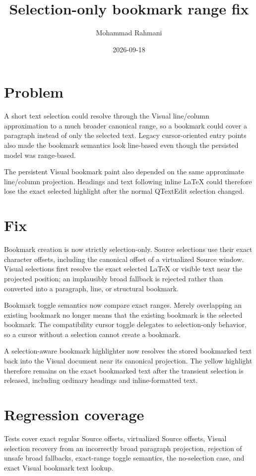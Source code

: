 \documentclass[a4paper]{article}
\title{Selection-only bookmark range fix}
\date{2026-09-18}
\author{Mohammad Rahmani}
\begin{document}
\maketitle

\section{Problem}
A short text selection could resolve through the Visual line/column approximation
to a much broader canonical range, so a bookmark could cover a paragraph instead
of only the selected text. Legacy cursor-oriented entry points also made the
bookmark semantics look line-based even though the persisted model was range-based.

The persistent Visual bookmark paint also depended on the same approximate
line/column projection. Headings and text following inline LaTeX could therefore
lose the exact selected highlight after the normal QTextEdit selection changed.

\section{Fix}
Bookmark creation is now strictly selection-only. Source selections use their
exact character offsets, including the canonical offset of a virtualized Source
window. Visual selections first resolve the exact selected LaTeX or visible text
near the projected position; an implausibly broad fallback is rejected rather
than converted into a paragraph, line, or structural bookmark.

Bookmark toggle semantics now compare exact ranges. Merely overlapping an
existing bookmark no longer means that the existing bookmark is the selected
bookmark. The compatibility cursor toggle delegates to selection-only behavior,
so a cursor without a selection cannot create a bookmark.

A selection-aware bookmark highlighter now resolves the stored bookmarked text
back into the Visual document near its canonical projection. The yellow
highlight therefore remains on the exact bookmarked text after the transient
selection is released, including ordinary headings and inline-formatted text.

\section{Regression coverage}
Tests cover exact regular Source offsets, virtualized Source offsets, Visual
selection recovery from an incorrectly broad paragraph projection, rejection of
unsafe broad fallbacks, exact-range toggle semantics, the no-selection case, and
exact Visual bookmark text lookup.
\end{document}
